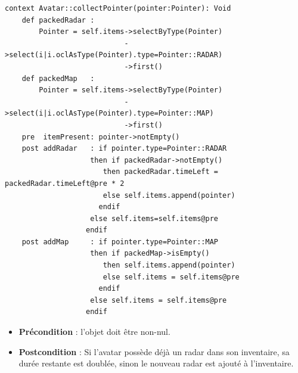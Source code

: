 \documentclass[oneside,a4paper]{book}
\begin{document}
\begin{itemize}
\begin{minipage}{\linewidth}
    \begin{lstlisting}
context Avatar::collectPointer(pointer:Pointer): Void
    def packedRadar : 
        Pointer = self.items->selectByType(Pointer)
                            ->select(i|i.oclAsType(Pointer).type=Pointer::RADAR)
                            ->first()
    def packedMap   : 
        Pointer = self.items->selectByType(Pointer)
                            ->select(i|i.oclAsType(Pointer).type=Pointer::MAP)
                            ->first()
    pre  itemPresent: pointer->notEmpty()
    post addRadar   : if pointer.type=Pointer::RADAR 
                    then if packedRadar->notEmpty()
                       then packedRadar.timeLeft = packedRadar.timeLeft@pre * 2
                       else self.items.append(pointer)
                      endif
                    else self.items=self.items@pre
                   endif
    post addMap     : if pointer.type=Pointer::MAP
                    then if packedMap->isEmpty()
                       then self.items.append(pointer)
                       else self.items = self.items@pre
                      endif
                    else self.items = self.items@pre
                   endif
    \end{lstlisting}
\end{minipage}
    \begin{itemize}
        \item \textbf{Précondition} : l'objet doit être non-nul.
        \item \textbf{Postcondition} : Si l'avatar possède déjà un radar dans son inventaire, sa durée restante est doublée, sinon le nouveau radar est ajouté à l'inventaire.
    \end{itemize}


\end{itemize}
\end{document}
